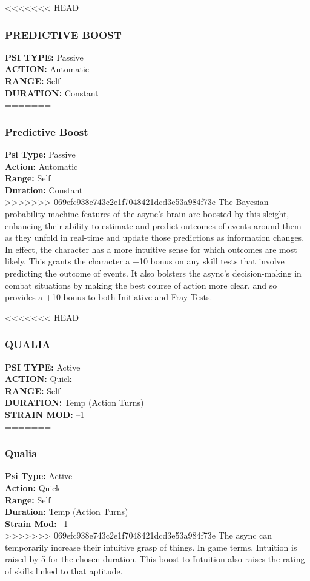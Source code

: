 <<<<<<< HEAD \subsubsection{PREDICTIVE BOOST} \textbf{PSI TYPE:} Passive \\ \textbf{ACTION:} Automatic \\ \textbf{RANGE:} Self \\ \textbf{DURATION:} Constant \\ ======= \subsubsection{Predictive Boost} \textbf{Psi Type:} Passive \\ \textbf{Action:} Automatic \\ \textbf{Range:} Self \\ \textbf{Duration:} Constant \\ >>>>>>> 069efc938e743c2e1f7048421dcd3e53a984f73e The Bayesian probability machine features of the async’s brain are boosted by this sleight, enhancing their ability to estimate and predict outcomes of events around them as they unfold in real-time and update those predictions as information changes. In effect, the character has a more intuitive sense for which outcomes are most likely. This grants the character a +10 bonus on any skill tests that involve predicting the outcome of events. It also bolsters the async’s decision-making in combat situations by making the best course of action more clear, and so provides a +10 bonus to both Initiative and Fray Tests. 

<<<<<<< HEAD \subsubsection{QUALIA} \textbf{PSI TYPE:} Active \\ \textbf{ACTION:} Quick \\ \textbf{RANGE:} Self \\ \textbf{DURATION:} Temp (Action Turns) \\ \textbf{STRAIN MOD:} –1 \\ ======= \subsubsection{Qualia} \textbf{Psi Type:} Active \\ \textbf{Action:} Quick \\ \textbf{Range:} Self \\ \textbf{Duration:} Temp (Action Turns) \\ \textbf{Strain Mod:} –1 \\ >>>>>>> 069efc938e743c2e1f7048421dcd3e53a984f73e The async can temporarily increase their intuitive grasp of things. In game terms, Intuition is raised by 5 for the chosen duration. This boost to Intuition also raises the rating of skills linked to that aptitude. 

